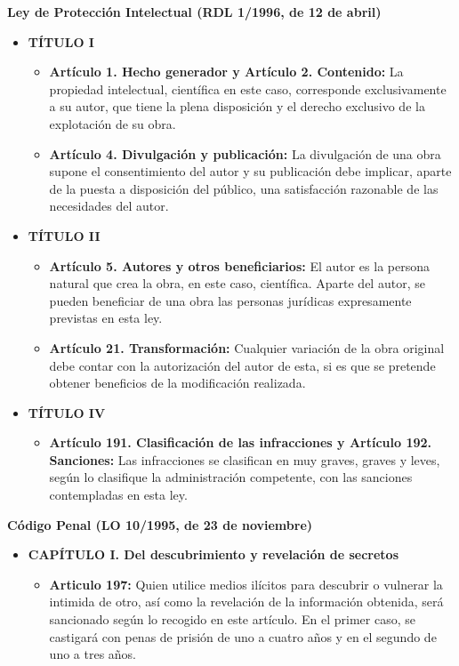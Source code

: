 \vspace{.5cm}\noindent\textbf{Ley de Protección Intelectual (RDL 1/1996, de 12 de abril)}~\cite{ministerio_de_cultura_real_1996}
\begin{itemize}
	\item \textbf{TÍTULO I}
	      \begin{itemize}
		      \item \textbf{Artículo 1. Hecho generador y Artículo 2. Contenido:} La propiedad intelectual, científica en este caso, corresponde exclusivamente a su autor, que tiene la plena disposición y el derecho exclusivo de la explotación de su obra.
		      \item \textbf{Artículo 4. Divulgación y publicación:} La divulgación de una obra supone el consentimiento del autor y su publicación debe implicar, aparte de la puesta a disposición del público, una satisfacción razonable de las necesidades del autor.
	      \end{itemize}
	\item \textbf{TÍTULO II}
	      \begin{itemize}
		      \item \textbf{Artículo 5. Autores y otros beneficiarios:} El autor es la persona natural que crea la obra, en este caso, científica. Aparte del autor, se pueden beneficiar de una obra las personas jurídicas expresamente previstas en esta ley.
		      \item \textbf{Artículo 21. Transformación:} Cualquier variación de la obra original debe contar con la autorización del autor de esta, si es que se pretende obtener beneficios de la modificación realizada.
	      \end{itemize}
	\item \textbf{TÍTULO IV}
	      \begin{itemize}
		      \item \textbf{Artículo 191. Clasificación de las infracciones y Artículo 192. Sanciones:} Las infracciones se clasifican en muy graves, graves y leves, según lo clasifique la administración competente, con las sanciones contempladas en esta ley.
	      \end{itemize}
\end{itemize}
\pagebreak

\noindent\textbf{Código Penal (LO 10/1995, de 23 de noviembre)}~\cite{jefatura_del_estado_ley_1995}
\begin{itemize}
	\item \textbf{CAPÍTULO I. Del descubrimiento y revelación de secretos}
	      \begin{itemize}
		      \item \textbf{Articulo 197:} Quien utilice medios ilícitos para descubrir o vulnerar la intimida de otro, así como la revelación de la información obtenida, será sancionado según lo recogido en este artículo. En el primer caso, se castigará con penas de prisión de uno a cuatro años y en el segundo de uno a tres años.
	      \end{itemize}
\end{itemize}

